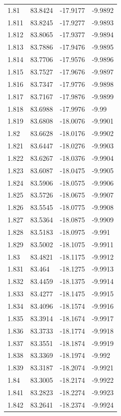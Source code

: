 \begin{tabular}{llll}
1.81 & 83.8424 & -17.9177 & -9.9892 \\
1.811 & 83.8245 & -17.9277 & -9.9893 \\
1.812 & 83.8065 & -17.9377 & -9.9894 \\
1.813 & 83.7886 & -17.9476 & -9.9895 \\
1.814 & 83.7706 & -17.9576 & -9.9896 \\
1.815 & 83.7527 & -17.9676 & -9.9897 \\
1.816 & 83.7347 & -17.9776 & -9.9898 \\
1.817 & 83.7167 & -17.9876 & -9.9899 \\
1.818 & 83.6988 & -17.9976 & -9.99 \\
1.819 & 83.6808 & -18.0076 & -9.9901 \\
1.82 & 83.6628 & -18.0176 & -9.9902 \\
1.821 & 83.6447 & -18.0276 & -9.9903 \\
1.822 & 83.6267 & -18.0376 & -9.9904 \\
1.823 & 83.6087 & -18.0475 & -9.9905 \\
1.824 & 83.5906 & -18.0575 & -9.9906 \\
1.825 & 83.5726 & -18.0675 & -9.9907 \\
1.826 & 83.5545 & -18.0775 & -9.9908 \\
1.827 & 83.5364 & -18.0875 & -9.9909 \\
1.828 & 83.5183 & -18.0975 & -9.991 \\
1.829 & 83.5002 & -18.1075 & -9.9911 \\
1.83 & 83.4821 & -18.1175 & -9.9912 \\
1.831 & 83.464 & -18.1275 & -9.9913 \\
1.832 & 83.4459 & -18.1375 & -9.9914 \\
1.833 & 83.4277 & -18.1475 & -9.9915 \\
1.834 & 83.4096 & -18.1574 & -9.9916 \\
1.835 & 83.3914 & -18.1674 & -9.9917 \\
1.836 & 83.3733 & -18.1774 & -9.9918 \\
1.837 & 83.3551 & -18.1874 & -9.9919 \\
1.838 & 83.3369 & -18.1974 & -9.992 \\
1.839 & 83.3187 & -18.2074 & -9.9921 \\
1.84 & 83.3005 & -18.2174 & -9.9922 \\
1.841 & 83.2823 & -18.2274 & -9.9923 \\
1.842 & 83.2641 & -18.2374 & -9.9924 \\

\end{tabular}
